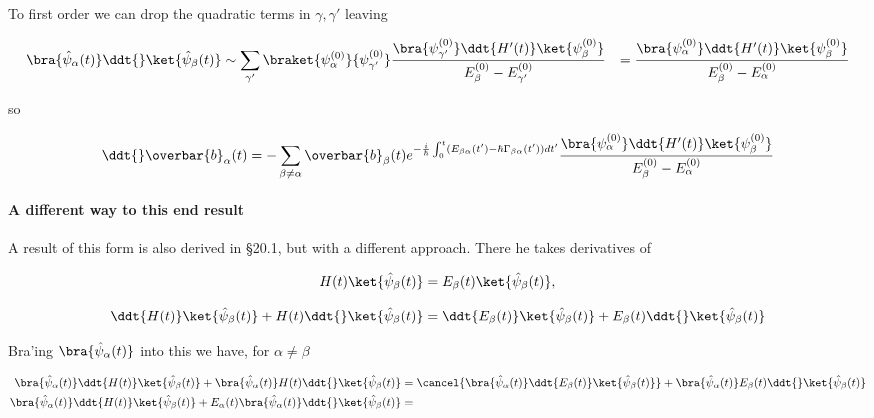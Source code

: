 {To first order we can drop the quadratic terms in $\gamma,\gamma'$ leaving

\begin{equation}\label{eqn:qmTwoR3:530}
\begin{aligned}
\bra{\hat{\psi}_\alpha(t)}
\ddt{} \ket{\hat{\psi}_\beta(t)}
&\sim
\sum_{\gamma'} 
\braket{\psi_{\alpha}^{(0)}}{\psi_{\gamma'}^{(0)}} 
\frac{ 
\bra{\psi_{\gamma'}^{(0)}} \ddt{H'(t)} \ket{\psi_\beta^{(0)}} 
}{
E_\beta^{(0)} 
-E_{\gamma'}^{(0)} 
}
&=
\frac{ 
\bra{\psi_{\alpha}^{(0)}} \ddt{H'(t)} \ket{\psi_\beta^{(0)}} 
}{
E_\beta^{(0)} 
-E_{\alpha}^{(0)} 
}
\end{aligned}
\end{equation}

so

\begin{equation}\label{eqn:qmTwoR3:550}
\ddt{}\overbar{b}_\alpha(t)
=
-\sum_{\beta \ne \alpha} \overbar{b}_\beta(t)
e^{-\frac{i}{\hbar} \int_0^t (E_{\beta\alpha}(t') - \hbar \Gamma_{\beta\alpha}(t')) dt'}
\frac{ 
\bra{\psi_{\alpha}^{(0)}} \ddt{H'(t)} \ket{\psi_\beta^{(0)}} 
}{
E_\beta^{(0)} 
-E_{\alpha}^{(0)} 
}
\end{equation}

\paragraph{A different way to this end result}

A result of this form is also derived in \citep{bohm1989qt} \S 20.1, but with a different approach.  There he takes derivatives of

\begin{equation}\label{eqn:qmTwoR3:610}
H(t) \ket{\hat{\psi}_\beta(t)} = E_\beta(t) \ket{\hat{\psi}_\beta(t)},
\end{equation}

\begin{equation}\label{eqn:qmTwoR3:630}
\ddt{H(t)} \ket{\hat{\psi}_\beta(t)} + H(t) \ddt{}\ket{\hat{\psi}_\beta(t)} = \ddt{E_\beta(t)} \ket{\hat{\psi}_\beta(t)}
+ E_\beta(t) \ddt{} \ket{\hat{\psi}_\beta(t)}
\end{equation}

Bra'ing $\bra{\hat{\psi}_\alpha(t)}$ into this we have, for $\alpha \ne \beta$

\begin{align*}
\bra{\hat{\psi}_\alpha(t)}
\ddt{H(t)} \ket{\hat{\psi}_\beta(t)} 
+ 
\bra{\hat{\psi}_\alpha(t)}
H(t) \ddt{}\ket{\hat{\psi}_\beta(t)} 
&= 
\cancel{
\bra{\hat{\psi}_\alpha(t)}
\ddt{E_\beta(t)} \ket{\hat{\psi}_\beta(t)}
}
+ 
\bra{\hat{\psi}_\alpha(t)}
E_\beta(t) \ddt{} \ket{\hat{\psi}_\beta(t)}
 \\
\bra{\hat{\psi}_\alpha(t)}
\ddt{H(t)} \ket{\hat{\psi}_\beta(t)} 
+ 
E_\alpha(t) \bra{\hat{\psi}_\alpha(t)}
\ddt{}\ket{\hat{\psi}_\beta(t)} 
&=
\end{align*}

}
